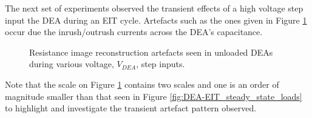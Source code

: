 The next set of experiments observed the transient effects of a high voltage step input the DEA during an EIT cycle. Artefacts such as the ones given in Figure \ref{fig:DEA-EIT_transients} occur due the inrush/outrush currents across the DEA's capacitance. 
\begin{figure}[H]
	\centering
	\hspace{0.2cm}
	\vspace{0.3cm}
	\caption{Resistance image reconstruction artefacts seen in unloaded DEAs during various voltage, $V_{DEA}$, step inputs.}
	\label{fig:DEA-EIT_transients}
\end{figure}
Note that the scale on Figure \ref{fig:DEA-EIT_transients} contains two scales and one is an order of magnitude smaller than that seen in Figure \ref{fig:DEA-EIT_steady_state_loads} to highlight and investigate the transient artefact pattern observed.


